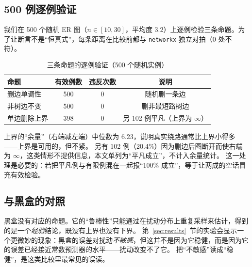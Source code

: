 \subsection{500 例逐例验证}

我们在 500 个随机 ER 图（$n\in[10,30]$，平均度 3.2）上逐例检验三条命题。为了让断言不是“恒真式”，每条距离在比较前都与 \texttt{networkx} 独立对拍（0 处不符）。

\begin{table}[H]
\centering
\caption{三条命题的逐例验证（500 个随机实例）}
\label{tab:robust}
\small
\setlength{\tabcolsep}{5pt}
\begin{tabular}{lccc}
\toprule
命题 & 有效例数 & 违反次数 & 说明 \\
\midrule
删边单调性 & 500 & 0 & 随机删一条边 \\
非树边不变 & 500 & 0 & 删非最短路树边 \\
单边删除上界 & 398 & 0 & 另 102 例平凡（上界为 $\infty$） \\
\bottomrule
\end{tabular}
\end{table}

上界的“余量”（右端减左端）中位数为 6.23，说明真实绕路通常比上界小得多——上界是可用的，但不紧。
另有 102 例（20.4\%）因为删边后图断开而使右端为 $\infty$，这类情形不提供信息，本文单列为“平凡成立”，不计入余量统计。
这一处理是必要的：若把平凡例与有限例混在一起报“100\% 成立”，等于让两成的空话冒充有效检验。

\subsection{与黑盒的对照}

黑盒没有对应的命题。它的“鲁棒性”只能通过在扰动分布上重复采样来估计，得到的是一个\emph{经验}结论，既没有上界也没有下界。
第~\ref{sec:results}~节的实验会显示一个更微妙的现象：黑盒的误差对扰动\emph{不敏感}，但这并不是因为它稳健，而是因为它的误差已经接近常数预测器的水平——扰动改变不了它。
把“不敏感”读成“稳健”，是这类比较里最常见的误读。

